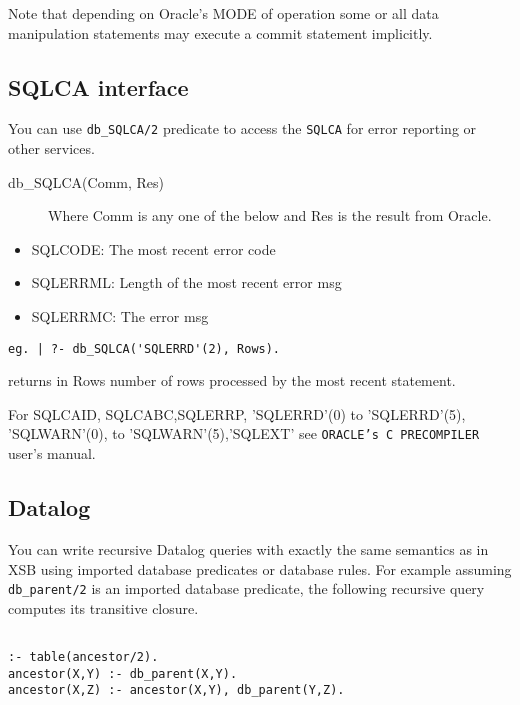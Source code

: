 Note that depending on Oracle's MODE of operation some or all data manipulation 
statements may execute a commit statement implicitly.


\subsection{SQLCA interface} \label{SQLCA}
You can use {\tt db\_SQLCA/2} predicate to access the {\tt SQLCA} for error 
reporting or other services.
\begin{description}

\item[db\_SQLCA(Comm, Res)]
	Where Comm is any one of the below and Res is the result
		    from Oracle.
\end{description}

\begin{itemize}
\item SQLCODE: The most recent error code
\item SQLERRML: Length of the most recent error msg
\item SQLERRMC: The error msg 
\end{itemize}
\begin{verbatim}
eg. | ?- db_SQLCA('SQLERRD'(2), Rows).
\end{verbatim}
returns in Rows number of rows processed by the most recent statement.

For SQLCAID, SQLCABC,SQLERRP, 'SQLERRD'(0) to 'SQLERRD'(5), 'SQLWARN'(0), to 
'SQLWARN'(5),'SQLEXT' see {\tt ORACLE's C PRECOMPILER} user's manual.


\subsection{Datalog}
You can write recursive Datalog queries with exactly the same
semantics as in XSB using imported database predicates or database
rules.  For example assuming {\tt db\_parent/2} is an imported database
predicate, the following recursive query computes its transitive closure.

\begin{verbatim}

:- table(ancestor/2).
ancestor(X,Y) :- db_parent(X,Y).
ancestor(X,Z) :- ancestor(X,Y), db_parent(Y,Z).
\end{verbatim}


